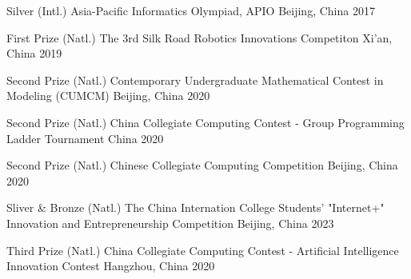 \begin{cvhonors}

\cvhonor
{Silver} %
{(Intl.) Asia-Pacific Informatics Olympiad, APIO} %
{Beijing, China} %
{2017} %

\cvhonor
{First Prize} %
{(Natl.) The 3rd Silk Road Robotics Innovations Competiton} %
{Xi'an, China} %
{2019} %

\cvhonor
{Second Prize} %
{(Natl.) Contemporary Undergraduate Mathematical Contest in Modeling (CUMCM)} %
{Beijing, China} %
{2020} %

\cvhonor
{Second Prize} %
{(Natl.) China Collegiate Computing Contest - Group Programming Ladder Tournament} %
{China} %
{2020} %


\cvhonor
{Second Prize} %
{(Natl.) Chinese Collegiate Computing Competition} %
{Beijing, China} %
{2020} %


\cvhonor
{Sliver \& Bronze} %
{(Natl.) The China Internation College Students' "Internet+" Innovation and Entrepreneurship Competition} %
{Beijing, China} %
{2023} %

\cvhonor
{Third Prize} %
{(Natl.) China Collegiate Computing Contest - Artificial Intelligence Innovation Contest} %
{Hangzhou, China} %
{2020} %







\end{cvhonors}

